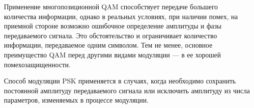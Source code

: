 \documentclass[a4paper,12pt]{article}
\begin{document}
\begin{enumerate}
Применение многопозиционной QAM способствует передаче большего количества информации, однако в реальных усло­виях, при наличии помех, на приемной стороне возможно ошибочное определение амплитуды и фазы передаваемого сигнала. Это обстоя­тельство и ограничивает количество информации, передаваемое од­ним символом. Тем не менее, основное преимущество QAM перед другими видами модуляции — в ее хорошей помехозащищенности. 

Способ модуляции PSK применяется в случаях, когда необхо­димо сохранить постоянной амплитуду передаваемого сигнала или исключить амплитуду из числа параметров, изменяемых в процессе модуляции. 
\end{enumerate}
\end{document}
